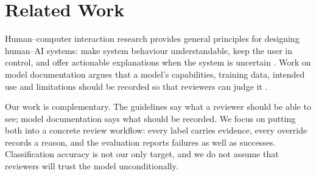 \section{Related Work}
\label{sec:related}

Human--computer interaction research provides general principles for designing human--AI
systems: make system behaviour understandable, keep the user in control, and offer
actionable explanations when the system is uncertain \cite{amershi2019}. Work on model
documentation argues that a model's capabilities, training data, intended use and
limitations should be recorded so that reviewers can judge it \cite{mitchell2019,gebru2021}.

Our work is complementary. The guidelines say what a reviewer should be able to see; model
documentation says what should be recorded. We focus on putting both into a concrete review
workflow: every label carries evidence, every override records a reason, and the evaluation
reports failures as well as successes. Classification accuracy is not our only target, and
we do not assume that reviewers will trust the model unconditionally.
